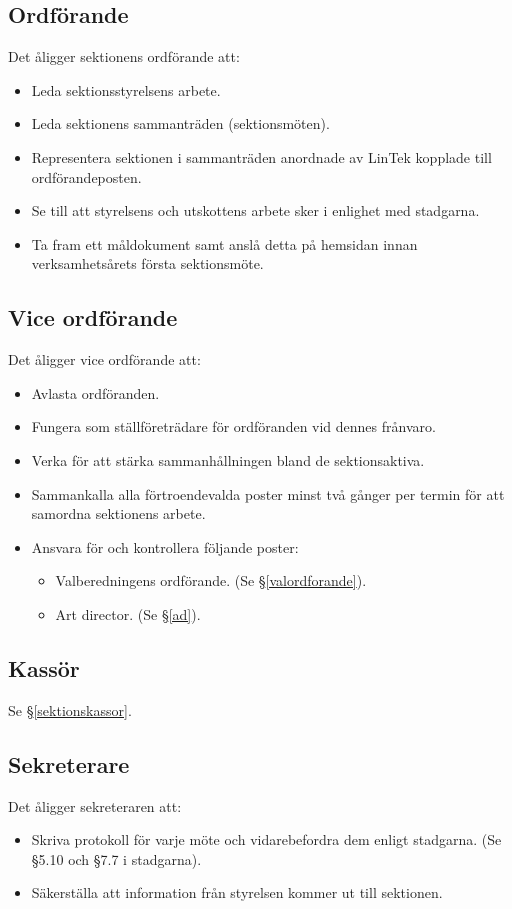 \documentclass{datateknologsektionen-document}
\begin{document}
\subsection{Ordförande}
\label{ordforande}
Det åligger sektionens ordförande att:
\begin{itemize}
  \item Leda sektionsstyrelsens arbete.
  \item Leda sektionens sammanträden (sektionsmöten).
  \item Representera sektionen i sammanträden anordnade av LinTek kopplade till ordförandeposten.
  \item Se till att styrelsens och utskottens arbete sker i enlighet med stadgarna.
  \item Ta fram ett måldokument samt anslå detta på hemsidan innan verksamhetsårets första sektionsmöte.
\end{itemize}
\subsection{Vice ordförande}
\label{viceordforande}
Det åligger vice ordförande att:
\begin{itemize}
  \item Avlasta ordföranden.
  \item Fungera som ställföreträdare för ordföranden vid dennes frånvaro.
  \item Verka för att stärka sammanhållningen bland de sektionsaktiva.
  \item Sammankalla alla förtroendevalda poster minst två gånger per termin för att samordna sektionens arbete.
  \item Ansvara för och kontrollera följande poster:
  \begin{itemize}
    \item Valberedningens ordförande. (Se \S \ref{valordforande}).
    \item Art director. (Se \S \ref{ad}).
  \end{itemize}
\end{itemize}

\subsection{Kassör}
\label{styrelsekassor}
Se \S \ref{sektionskassor}.
\subsection{Sekreterare}
\label{sekreterare}
Det åligger sekreteraren att:
\begin{itemize}
  \item Skriva protokoll för varje möte och vidarebefordra dem enligt stadgarna. (Se \S 5.10 och \S 7.7 i stadgarna).
  \item Säkerställa att information från styrelsen kommer ut till sektionen.
\end{itemize}
\end{document}
